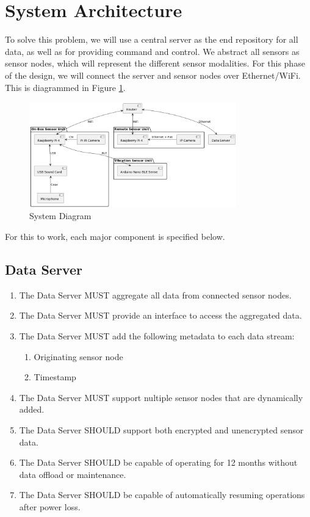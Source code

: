 \documentclass{article}
\begin{document}
\section{System Architecture}
To solve this problem, we will use a central server as the end repository for all data, as well as for providing command and control.  We abstract all sensors as sensor nodes, which will represent the different sensor modalities.  For this phase of the design, we will connect the server and sensor nodes over Ethernet/WiFi. This is diagrammed in Figure \ref{fig:sys_diag}.

\begin{figure}[ht]
    \centering
    \includegraphics[width=0.8\textwidth]{images/System Diagram.png}
    \caption{System Diagram}
    \label{fig:sys_diag}
\end{figure}

For this to work, each major component is specified below.
\subsection{Data Server}
\begin{enumerate}
    \item The Data Server MUST aggregate all data from connected sensor nodes.
    \item The Data Server MUST provide an interface to access the aggregated data.
    \item The Data Server MUST add the following metadata to each data stream:
    \begin{enumerate}
        \item Originating sensor node
        \item Timestamp
    \end{enumerate}
    \item The Data Server MUST support nultiple sensor nodes that are dynamically added.
    \item The Data Server SHOULD support both encrypted and unencrypted sensor data.
    \item The Data Server SHOULD be capable of operating for 12 months without data offload or maintenance.
    \item The Data Server SHOULD be capable of automatically resuming operations after power loss.
\end{enumerate}
\end{document}
